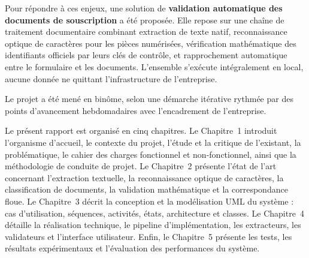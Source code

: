 Pour répondre à ces enjeux, une solution de \textbf{validation automatique des
documents de souscription} a été proposée. Elle repose sur une chaîne de
traitement documentaire combinant extraction de texte natif, reconnaissance
optique de caractères pour les pièces numérisées, vérification mathématique des
identifiants officiels par leurs clés de contrôle, et rapprochement automatique
entre le formulaire et les documents. L'ensemble s'exécute intégralement en
local, aucune donnée ne quittant l'infrastructure de l'entreprise.

Le projet a été mené en binôme, selon une démarche itérative rythmée par des
points d'avancement hebdomadaires avec l'encadrement de l'entreprise.

Le pr\'{e}sent rapport est organis\'{e} en cinq chapitres. Le Chapitre~1 introduit l'organisme d'accueil, le contexte du projet, l'\'{e}tude et la critique de l'existant, la probl\'{e}matique, le cahier des charges fonctionnel et non-fonctionnel, ainsi que la m\'{e}thodologie de conduite de projet. Le Chapitre~2 pr\'{e}sente l'\'{e}tat de l'art concernant l'extraction textuelle, la reconnaissance optique de caract\`{e}res, la classification de documents, la validation math\'{e}matique et la correspondance floue. Le Chapitre~3 d\'{e}crit la conception et la mod\'{e}lisation UML du syst\`{e}me : cas d'utilisation, s\'{e}quences, activit\'{e}s, \'{e}tats, architecture et classes. Le Chapitre~4 d\'{e}taille la r\'{e}alisation technique, le pipeline d'impl\'{e}mentation, les extracteurs, les validateurs et l'interface utilisateur. Enfin, le Chapitre~5 pr\'{e}sente les tests, les r\'{e}sultats exp\'{e}rimentaux et l'\'{e}valuation des performances du syst\`{e}me.

